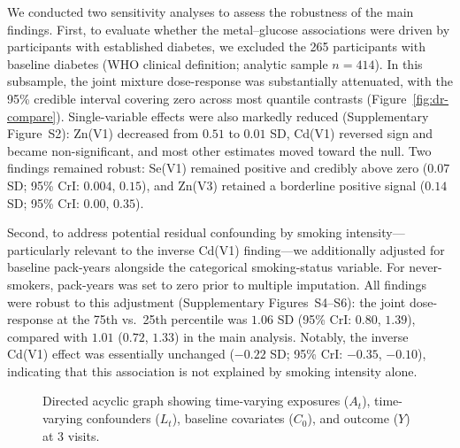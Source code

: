 We conducted two sensitivity analyses to assess the robustness of the main findings. First, to evaluate whether the metal--glucose associations were driven by participants with established diabetes, we excluded the 265 participants with baseline diabetes (WHO clinical definition; analytic sample $n = 414$). In this subsample, the joint mixture dose-response was substantially attenuated, with the 95\% credible interval covering zero across most quantile contrasts (Figure~\ref{fig:dr-compare}). Single-variable effects were also markedly reduced (Supplementary Figure~S2): Zn(V1) decreased from $0.51$ to $0.01$ SD, Cd(V1) reversed sign and became non-significant, and most other estimates moved toward the null. Two findings remained robust: Se(V1) remained positive and credibly above zero ($0.07$ SD; 95\% CrI: $0.004$, $0.15$), and Zn(V3) retained a borderline positive signal ($0.14$ SD; 95\% CrI: $0.00$, $0.35$).

Second, to address potential residual confounding by smoking intensity---particularly relevant to the inverse Cd(V1) finding---we additionally adjusted for baseline pack-years alongside the categorical smoking-status variable. For never-smokers, pack-years was set to zero prior to multiple imputation. All findings were robust to this adjustment (Supplementary Figures~S4--S6): the joint dose-response at the 75th vs.\ 25th percentile was $1.06$ SD (95\% CrI: $0.80$, $1.39$), compared with $1.01$ ($0.72$, $1.33$) in the main analysis. Notably, the inverse Cd(V1) effect was essentially unchanged ($-0.22$ SD; 95\% CrI: $-0.35$, $-0.10$), indicating that this association is not explained by smoking intensity alone.

\clearpage

\begin{figure}[h]
\centering
{}
\caption{Directed acyclic graph showing time-varying exposures ($A_t$), time-varying confounders ($L_t$), baseline covariates ($C_0$), and outcome ($Y$) at 3 visits.}
\label{fig:dag}
\end{figure}

